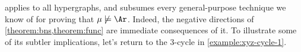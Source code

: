  applies to all hypergraphs, and subsumes every general-purpose technique we know of for proving that $\mu \not\models \Ar$. 
Indeed, the negative directions of \cref{theorem:bns,theorem:func} are
 immediate consequences of it.
%
To illustrate
some of its subtler implications,
let's return to the 3-cycle in \cref{example:xyz-cycle-1}.

